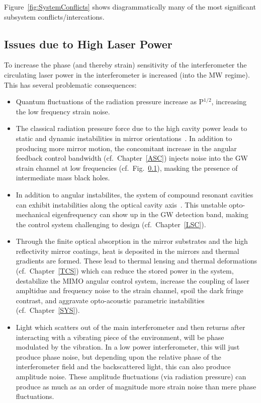 Figure~\ref{fig:SystemConflicts} shows diagrammatically many of the most
significant subsystem conflicts/intercations.

\subsection{Issues due to High Laser Power}
To increase the phase (and thereby strain) sensitivity of the interferometer
the circulating laser power in the interferometer is increased (into the MW
regime). This has several problematic consequences:
\begin{itemize}
\item Quantum fluctuations of the radiation pressure increase as P$^{1/2}$,
  increasing the low frequency strain noise.
\item The classical radiation pressure force due to the high cavity power
leads to static and dynamic instabilities in mirror
orientations~\cite{Sidles:2006un, Dooley:13, aLIGO:ASC}. In addition to producing
more mirror motion, the concomitant increase in the angular feedback
control bandwidth (cf.~Chapter~\ref{ASC}) injects noise into the GW strain
channel at low frequencies (cf.~Fig.~\ref{}), masking the presence of
intermediate mass black holes.
\item In addition to angular instabilites, the system of compound resonant
cavities can exhibit instabilities along the optical cavity
axis~\cite{SGLMW2004, BuCh2002, Osamu:spring}. This
unstable opto-mechanical eigenfrequency can show up in the GW detection band,
making the control system challenging to design (cf.~Chapter~\ref{LSC}).
\item Through the finite optical absorption in the mirror substrates and the
high reflectivity mirror coatings, heat is deposited in the mirrors and thermal
gradients are formed. These lead to thermal lensing and thermal deformations
(cf.~Chapter~\ref{TCS}) which can reduce the stored power in the system, destabilize
the MIMO angular control system, increase the coupling of laser ampltidue and
frequency noise to the strain channel, spoil the dark fringe contrast, and
aggravate opto-acoustic parametric instabilities (cf.~Chapter~\ref{SYS}).
\item Light which scatters out of the main interferometer and then returns
  after interacting with a vibrating piece of the environment, will be phase
  modulated by the vibration. In a low power interferometer, this will just
  produce phase noise, but depending upon the relative phase of the
  interferometer field and the backscattered light, this can also produce
  amplitude noise. These amplitude fluctuations (via radiation pressure) can
  produce as much as an order of magnitude more strain noise than mere
  phase fluctuations.

\end{itemize}

